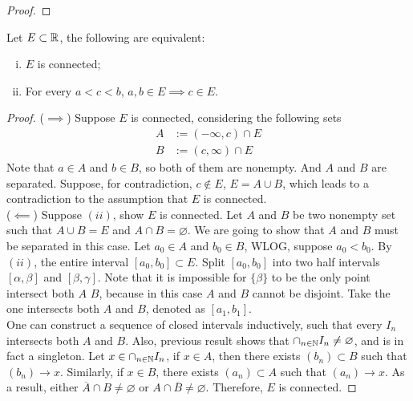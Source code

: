 \documentclass[11pt]{article}
\begin{document}
	\begin{proof}
		
	\end{proof}
	
	\begin{theorem}
		Let $E \subset \mathbb{R}$, the following are equivalent:
		\begin{enumerate}[(i)]
			\item $E$ is connected;
			\item For every $a < c < b$, $a, b \in E \implies c \in E$.
		\end{enumerate}
	\end{theorem}
	
	\begin{proof}
		($\implies$) Suppose $E$ is connected, considering the following sets
		\begin{align}
			A &:= (-\infty, c) \cap E \\
			B &:= (c, \infty) \cap E
		\end{align}
		Note that $a \in A$ and $b \in B$, so both of them are nonempty. And $A$ and $B$ are separated. Suppose, for contradiction, $c \notin E$, $E = A \cup B$, which leads to a contradiction to the assumption that $E$ is connected.
		\\
		($\impliedby$) Suppose $(ii)$, show $E$ is connected. Let $A$ and $B$ be two nonempty set such that $A \cup B = E$ and $A \cap B = \varnothing$. We are going to show that $A$ and $B$ must be separated in this case. Let $a_0 \in A$ and $b_0 \in B$, WLOG, suppose $a_0 < b_0$. By $(ii)$, the entire interval $[a_0, b_0] \subset E$. Split $[a_0, b_0]$ into two half intervals $[\alpha, \beta]$ and $[\beta, \gamma]$. Note that it is impossible for $\{\beta\}$ to be the only point intersect both $A$ $B$, because in this case $A$ and $B$ cannot be disjoint.
		Take the one intersects both $A$ and $B$, denoted as $[a_1, b_1]$. \\
		One can construct a sequence of closed intervals inductively, such that every $I_n$ intersects both $A$ and $B$. Also, previous result shows that $\cap_{n \in \mathbb{N}} I_n \neq \varnothing$, and is in fact a singleton. Let $x \in \cap_{n \in \mathbb{N}} I_n$, if $x \in A$, then there exists $(b_n) \subset B$ such that $(b_n) \to x$. Similarly, if $x \in B$, there exists $(a_n) \subset A$ such that $(a_n) \to x$. As a result, either $\overline{A} \cap B \neq \varnothing$ or $A \cap \overline{B} \neq \varnothing$. Therefore, $E$ is connected.
	\end{proof}
	
\end{document}
